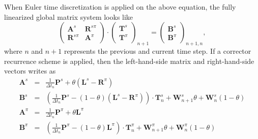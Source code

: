 When Euler time discretization is applied on the above equation, the fully linearized global matrix system looks like
\begin{equation}
\left(
\begin{array}{cc}
\bm{A}^s & \bm{R}^{s \pi} \\
\bm{R}^{s \pi} & \bm{A}^\pi
\end{array}
\right) 
\cdot 
\left(
\begin{array}{c}
\bm{T}^s \\
\bm{T}^\pi
\end{array}
\right)_{n+1}
= 
\left( 
\begin{array}{c}
\bm{B}^s \\
\bm{B}^\pi
\end{array}
\right)_{n+1, n} , 
\end{equation}
where $n$ and $n+1$ represents the previous and current time step. If a corrector recurrence scheme is applied, then the left-hand-side matrix and right-hand-side vectors writes as 
\begin{eqnarray}
\label{eqn:linearized_matrix_system}
\bm{A}^s & = & \frac{1}{\Delta t_n} \bm{P}^s + \theta \left( \bm{L}^s - \bm{R}^\pi \right) \nonumber \\ 
\bm{B}^s & = & \left( \frac{1}{\Delta t_n} \bm{P}^s - (1 - \theta) \left( \bm{L}^s - \bm{R}^\pi \right) \right) \cdot \bm{T}_n^s + \bm{W}_{n+1}^s \theta + \bm{W}_{n}^s (1 - \theta) \nonumber \\
\bm{A}^\pi & = & \frac{1}{\Delta t_n} \bm{P}^\pi + \theta \bm{L}^\pi \nonumber \\ 
\bm{B}^\pi & = & \left( \frac{1}{\Delta t_n} \bm{P}^\pi - (1 - \theta) \bm{L}^\pi \right) \cdot \bm{T}_n^\pi + \bm{W}_{n+1}^\pi \theta + \bm{W}_{n}^\pi (1 - \theta) 
\end{eqnarray}
